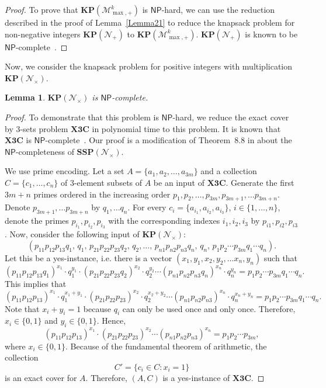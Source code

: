 \documentclass[reqno,12pt]{amsart}
\newtheorem{lemma}{Lemma}
\theoremstyle{definition}
\newcommand{\NP}{\mathsf{NP}}
\newcommand{\MP}{\mathcal{M}_{\max, {+}}^k}
\newcommand{\ZP}{\mathcal{N}_{+}}
\newcommand{\ZT}{\mathcal{N}_{\times}}
\newcommand{\XThreeC}{\mathbf{X3C}}
\newcommand{\KP}{\mathbf{KP}(\ZP)}
\newcommand{\MKP}{\mathbf{KP}(\ZT)}
\newcommand{\SPP}{\mathbf{SSP}(\ZT)}
\newcommand{\KMPP}{\mathbf{KP}(\MP)}
\begin{document}
\begin{proof}
To prove that $\KMPP$ is $\NP$-hard,
we can use the reduction described in the proof of Lemma~\ref{Lemma21} to
 reduce the knapsack problem for non-negative integers $\KP$ to $\KMPP$. $\KP$ is known to be $\NP$-complete~\cite[Proposition 4.1.1]{Haase2012}.
\end{proof}

Now, we consider the knapsack problem for positive integers with multiplication $\MKP$.

\begin{lemma}\label{LemmaKPZNPComplete}
$\MKP$ is $\NP$-complete.
\end{lemma}

\begin{proof}
To demonstrate that this problem is $\NP$-hard, we reduce the exact cover by 3-sets problem $\XThreeC$ in polynomial time to this problem. It is known that $\XThreeC$ is $\NP$-complete~\cite[Problem SP2]{GareyJohnson1979}.
Our proof is a modification of Theorem~8.8 in \cite{Moret1997} about the $\NP$-completeness of $\SPP$.

We use prime encoding. Let a set $A = \{a_1, a_2, \ldots, a_{3m}\}$ and a collection
$C = \{c_1, \ldots, c_n\}$ of $3$-element subsets of $A$ be an input of $\XThreeC$.
Generate the first $3m + n$ primes ordered in the increasing order $p_1, p_2, \ldots, p_{3m}, p_{3m+1}, \ldots p_{3m+n}$. Denote $p_{3m+1}, \ldots p_{3m+n}$ by $q_1, \ldots q_n$.
For every $c_i = \{a_{i_1}, a_{i_2}, a_{i_3}\}$, 
$i \in \{1, \ldots, n\}$, denote the primes $p_{i_1}, p_{i_2}, p_{i_3}$ with the corresponding indexes 
$i_1, i_2, i_3$ by $p_{i1}, p_{i2}, p_{i3}$.
Now, consider the following input of $\MKP$:
\begin{equation}\label{Lemma8Inst}
(p_{11}p_{12}p_{13}q_1,\, q_1,\, p_{21}p_{22}p_{23}q_2,\, q_2, \ldots,\, p_{n1}p_{n2}p_{n3}q_n,\, q_n,\, p_1p_2\cdots p_{3m}q_1\cdots q_n).
\end{equation}
Let this be a yes-instance, i.e. there is a vector $(x_1, y_1, x_2, y_2, \ldots x_n, y_n)$ such that
$$
(p_{11}p_{12}p_{13}q_1)^{x_1} \cdot q_1^{y_1} \cdot (p_{21}p_{22}p_{23}q_2)^{x_2} \cdot q_2^{y_2} \cdots  (p_{n1}p_{n2}p_{n3}q_n)^{x_n} \cdot q_n^{y_n} = p_1p_2\cdots p_{3m}q_1\cdots q_n.
$$
This implies that
$$
(p_{11}p_{12}p_{13})^{x_1} \cdot q_1^{x_1 + y_1} \cdot (p_{21}p_{22}p_{23})^{x_2} \cdot q_2^{x_2 + y_2} \cdots (p_{n1}p_{n2}p_{n3})^{x_n} \cdot q_n^{x_n + y_n} = p_1p_2\cdots p_{3m}q_1\cdots q_n.
$$
Note that $x_i + y_i = 1$ because $q_i$ can only be used once and only once. Therefore,
 $x_i \in \{0, 1\}$ and $y_i \in \{0, 1\}$. 
Hence,
\begin{equation}\label{Lemma8Fml}
(p_{11}p_{12}p_{13})^{x_1} \cdot (p_{21}p_{22}p_{23})^{x_2} \cdots (p_{n1}p_{n2}p_{n3})^{x_n} = p_1p_2\cdots p_{3m},
\end{equation}
where $x_i \in \{0, 1\}$.
Because of the fundamental theorem of arithmetic, 
the collection 
$$C' = \{c_i \in C : x_i = 1\}$$
is an exact cover for $A$.
Therefore, $(A, C)$ is a yes-instance of $\XThreeC$.


\end{proof}
\end{document}
